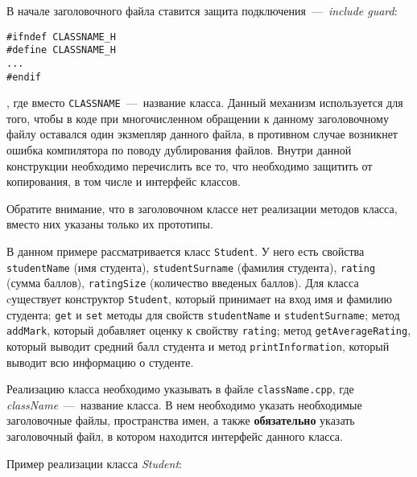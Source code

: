 В начале заголовочного файла ставится защита подключения~---~\emph{include guard}:

\begin{lstlisting}
#ifndef CLASSNAME_H
#define CLASSNAME_H
...
#endif
\end{lstlisting}

, где вместо \lstinline|CLASSNAME|~---~название класса. Данный механизм используется для того, чтобы в коде при многочисленном обращении к данному заголовочному файлу оставался один экзмепляр данного файла, в противном случае возникнет ошибка компилятора по поводу дублирования файлов. Внутри данной конструкции необходимо перечислить все то, что необходимо защитить от копирования, в том числе и интерфейс классов.

Обратите внимание, что в заголовочном классе нет реализации методов класса, вместо них указаны только их прототипы.

В данном примере рассматривается класс \lstinline|Student|. У него есть свойства \lstinline|studentName| (имя студента), \lstinline|studentSurname| (фамилия студента), \lstinline|rating| (сумма баллов), \lstinline|ratingSize| (количество введеных баллов). Для класса cуществует конструктор \lstinline|Student|, который принимает на вход имя и фамилию студента; \lstinline|get| и \lstinline|set| методы для свойств \lstinline|studentName| и \lstinline|studentSurname|; метод \lstinline|addMark|, который добавляет оценку к свойству \lstinline|rating|; метод \lstinline|getAverageRating|, который выводит средний балл студента и метод \lstinline|printInformation|, который выводит всю информацию о студенте.

Реализацию класса необходимо указывать в файле \lstinline|className.cpp|, где \emph{className}~---~название класса. В нем необходимо указать необходимые заголовочные файлы, пространства имен, а также \textbf{обязательно} указать заголовочный файл, в котором находится интерфейс данного класса.

Пример реализации класса \emph{Student}:

